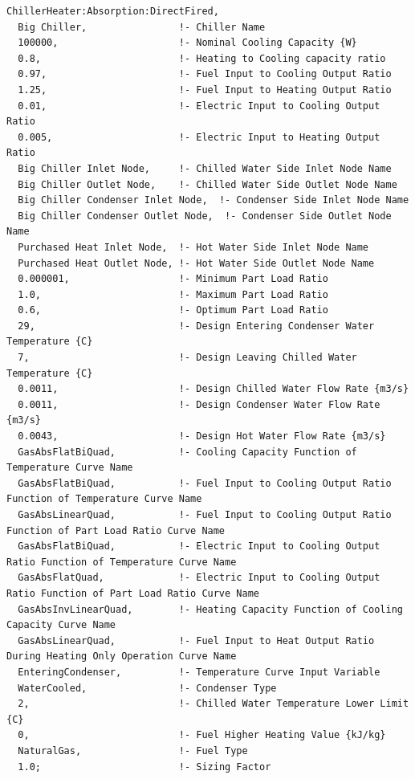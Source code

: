 \begin{lstlisting}
ChillerHeater:Absorption:DirectFired,
  Big Chiller,                !- Chiller Name
  100000,                     !- Nominal Cooling Capacity {W}
  0.8,                        !- Heating to Cooling capacity ratio
  0.97,                       !- Fuel Input to Cooling Output Ratio
  1.25,                       !- Fuel Input to Heating Output Ratio
  0.01,                       !- Electric Input to Cooling Output Ratio
  0.005,                      !- Electric Input to Heating Output Ratio
  Big Chiller Inlet Node,     !- Chilled Water Side Inlet Node Name
  Big Chiller Outlet Node,    !- Chilled Water Side Outlet Node Name
  Big Chiller Condenser Inlet Node,  !- Condenser Side Inlet Node Name
  Big Chiller Condenser Outlet Node,  !- Condenser Side Outlet Node Name
  Purchased Heat Inlet Node,  !- Hot Water Side Inlet Node Name
  Purchased Heat Outlet Node, !- Hot Water Side Outlet Node Name
  0.000001,                   !- Minimum Part Load Ratio
  1.0,                        !- Maximum Part Load Ratio
  0.6,                        !- Optimum Part Load Ratio
  29,                         !- Design Entering Condenser Water Temperature {C}
  7,                          !- Design Leaving Chilled Water Temperature {C}
  0.0011,                     !- Design Chilled Water Flow Rate {m3/s}
  0.0011,                     !- Design Condenser Water Flow Rate {m3/s}
  0.0043,                     !- Design Hot Water Flow Rate {m3/s}
  GasAbsFlatBiQuad,           !- Cooling Capacity Function of Temperature Curve Name
  GasAbsFlatBiQuad,           !- Fuel Input to Cooling Output Ratio Function of Temperature Curve Name
  GasAbsLinearQuad,           !- Fuel Input to Cooling Output Ratio Function of Part Load Ratio Curve Name
  GasAbsFlatBiQuad,           !- Electric Input to Cooling Output Ratio Function of Temperature Curve Name
  GasAbsFlatQuad,             !- Electric Input to Cooling Output Ratio Function of Part Load Ratio Curve Name
  GasAbsInvLinearQuad,        !- Heating Capacity Function of Cooling Capacity Curve Name
  GasAbsLinearQuad,           !- Fuel Input to Heat Output Ratio During Heating Only Operation Curve Name
  EnteringCondenser,          !- Temperature Curve Input Variable
  WaterCooled,                !- Condenser Type
  2,                          !- Chilled Water Temperature Lower Limit {C}
  0,                          !- Fuel Higher Heating Value {kJ/kg}
  NaturalGas,                 !- Fuel Type
  1.0;                        !- Sizing Factor
\end{lstlisting}

